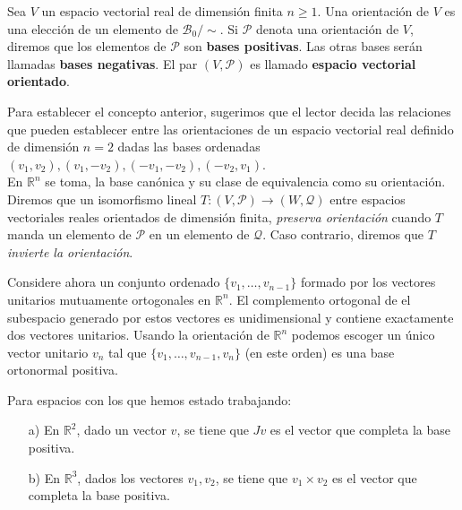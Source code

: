 \documentclass[oneside,11pt]{memoir}
\begin{document}
\begin{definition}
    Sea $V$ un espacio vectorial real de dimensión finita $n\geq 1$. Una orientación de $V$ es una elección de un elemento de $\mathcal{B}_0/\sim$. Si $\mathbf{\mathcal{P}}$ denota una orientación de $V$, diremos que los elementos de $\mathbf{\mathcal{P}}$ son \textbf{bases positivas}. Las otras bases serán llamadas \textbf{bases negativas}. El par $(V, \mathbf{\mathcal{P}})$ es llamado \textbf{espacio vectorial orientado}.
\end{definition}
Para establecer el concepto anterior, sugerimos que el lector decida las relaciones que pueden establecer entre las orientaciones de un espacio vectorial real definido de dimensión $n = 2$ dadas las bases ordenadas $(v_1,v_2), (v_1,-v_2), (-v_1,-v_2), (-v_2,v_1)$. \\

En $\mathbb{R}^n$ se toma, la base canónica y su clase de equivalencia como su orientación.\\

Diremos que un isomorfismo lineal $T:(V, \mathbf{\mathcal{P}})\to (W, \mathbf{\mathcal{Q}})$ entre espacios vectoriales reales orientados de dimensión finita, \textit{preserva orientación} cuando $T$ manda un elemento de $\mathbf{\mathcal{P}}$ en un elemento de  $\mathbf{\mathcal{Q}}$. Caso contrario, diremos que $T$ \textit{invierte la orientación}.

Considere ahora un conjunto ordenado $\{v_1,\ldots,v_{n-1}\}$ formado por los vectores unitarios mutuamente ortogonales en $\mathbb{R}^n$. El complemento ortogonal de el subespacio generado por estos vectores es unidimensional y contiene exactamente dos vectores unitarios. Usando la orientación de $\mathbb{R}^n$ podemos escoger un único vector unitario $v_n$ tal que $\{v_1,\ldots,v_{n-1},v_n\}$ (en este orden) es una base ortonormal positiva.
\begin{example}
Para espacios con los que hemos estado trabajando:
    \begin{enumerate}
        \item[a)] En $\mathbb{R}^2$, dado un vector $v$, se tiene que $Jv$ es el vector que completa la base positiva.
        \item[b)] En $\mathbb{R}^3$, dados los vectores $v_1,v_2$, se tiene que $v_1\times v_2$ es el vector que completa la base positiva.
    \end{enumerate}
\end{example}
\end{document}
